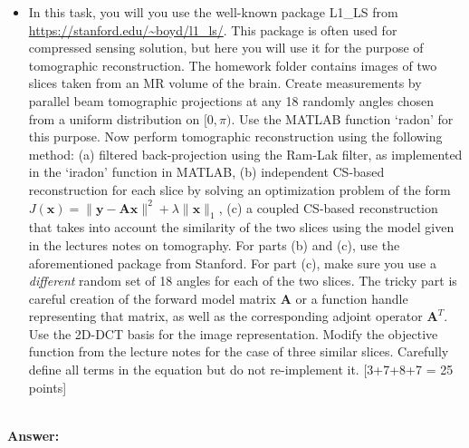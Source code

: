 \documentclass[12pt]{article}
\author{\textbf{Question 3}}
\date{}
\begin{document}
\maketitle

\begin{itemize}
    \item In this task, you will you use the well-known package L1\_LS from \url{https://stanford.edu/~boyd/l1_ls/}. This package is often used for compressed sensing solution, but here you will use it for the purpose of tomographic reconstruction. The homework folder contains images of two slices taken from an MR volume of the brain. Create measurements by parallel beam tomographic projections at any 18 randomly angles chosen from a uniform distribution on $[0,\pi)$. Use the MATLAB function `radon' for this purpose. Now perform tomographic reconstruction using the following method: (a) filtered back-projection using the Ram-Lak filter, as implemented in the `iradon' function in MATLAB, (b) independent CS-based reconstruction for each slice by solving an optimization problem of the form $J(\boldsymbol{x}) = \|\boldsymbol{y}-\boldsymbol{Ax}\|^2 + \lambda \|\boldsymbol{x}\|_1$, (c) a coupled CS-based reconstruction that takes into account the similarity of the two slices using the model given in the lectures notes on tomography. For parts (b) and (c), use the aforementioned package from Stanford. For part (c), make sure you use a \emph{different} random set of 18 angles for each of the two slices. The tricky part is careful creation of the forward model matrix $\boldsymbol{A}$ or a function handle representing that matrix, as well as the corresponding adjoint operator $\boldsymbol{A}^T$. Use the 2D-DCT basis for the image representation. Modify the objective function from the lecture notes for the case of three similar slices. Carefully define all terms in the equation but do not re-implement it. 
 \textsf{[3+7+8+7 = 25 points]}
\end{itemize}
\vspace*{0.5cm}\\
\textbf{Answer:} \\
\end{document}

